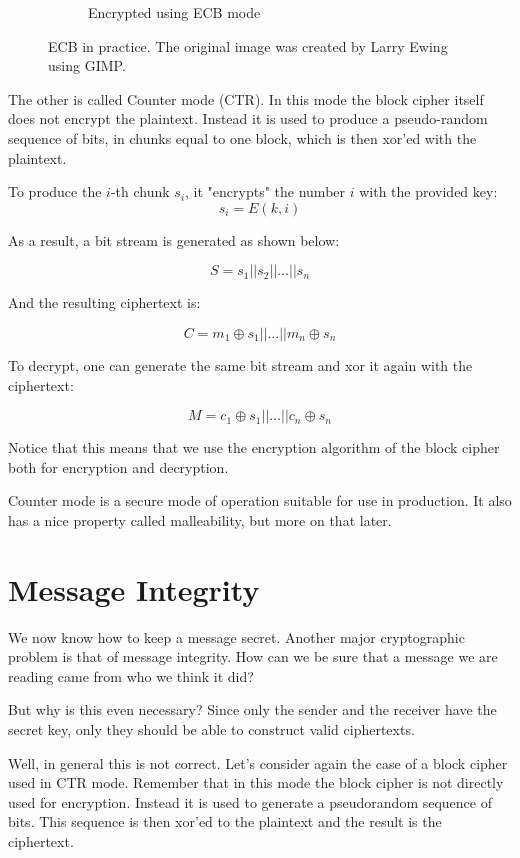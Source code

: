 \begin{figure}[h]
\begin{subfigure}[b]{0.4\textwidth}
    \caption{Encrypted using ECB mode}
    \label{figures:tux_ecb}
  \end{subfigure}
  \caption[ECB in practice]{ECB in practice. The original image was created by Larry Ewing using GIMP.}
  \label{figures:ecb_in_practice}
  \hfill
\end{figure}

The other is called Counter mode (CTR).
In this mode the block cipher itself does not encrypt the plaintext.
Instead it is used to produce a pseudo-random sequence of bits, in chunks equal to one block, which is then xor'ed with the plaintext.

To produce the $i$-th chunk $s_i$, it "encrypts" the number $i$ with the provided key:
\[
  s_i = E(k, i)
\]

As a result, a bit stream is generated as shown below:

\[
  S = s_1 || s_2 || \dots || s_n
\]

And the resulting ciphertext is:

\[
  C = m_1 \oplus s_1 || \dots || m_n \oplus s_n
\]

To decrypt, one can generate the same bit stream and xor it again with the ciphertext:

\[
  M = c_1 \oplus s_1 || \dots || c_n \oplus s_n
\]

Notice that this means that we use the encryption algorithm of the block cipher both for encryption and decryption.

Counter mode is a secure mode of operation suitable for use in production.
It also has a nice property called malleability, but more on that later.


\section{Message Integrity}

We now know how to keep a message secret.
Another major cryptographic problem is that of message integrity.
How can we be sure that a message we are reading came from who we think it did?

But why is this even necessary?
Since only the sender and the receiver have the secret key, only they should be able to construct valid ciphertexts.

Well, in general this is not correct.
Let's consider again the case of a block cipher used in CTR mode.
Remember that in this mode the block cipher is not directly used for encryption.
Instead it is used to generate a pseudorandom sequence of bits.
This sequence is then xor'ed to the plaintext and the result is the ciphertext.

